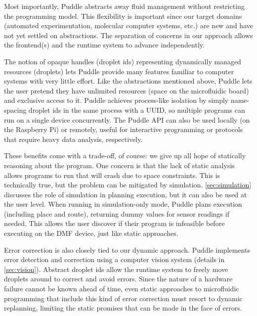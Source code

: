 \documentclass[sigconf, screen]{acmart}
\newcommand\karin[1]{\todo[color=green!80]{\sf #1}}
\newcommand\pavel[1]{\todo[color=blue!60]{\sf #1}}
\begin{document}
Most importantly, Puddle abstracts away fluid management without restricting the programming model.
This flexibility is important since our target domains (automated experimentation, molecular computer systems, etc.) are new and have not yet settled on abstractions.
The separation of concerns in our approach allows the frontend(s) and the runtime system to advance independently.

The notion of opaque handles (droplet ids) representing dynamically managed resources (droplets) lets Puddle provide many features familiar to computer systems with very little effort.
Like the abstractions mentioned above, Puddle lets the user pretend they have unlimited resources (space on the microfluidic board) and exclusive access to it.
Puddle achieves process-like isolation by simply name-spacing droplet ids in the same process with a UUID, so multiple programs can run on a single device concurrently.
The Puddle API can also be used locally (on the Raspberry Pi) or remotely, useful for interactive programming or protocols that require heavy data analysis, respectively.

\pavel{split here, move above to 3.2}

These benefits come with a trade-off, of course: we give up all hope of statically reasoning about the program.
One concern is that the lack of static analysis allows programs to run that will crash due to space constraints.
This is technically true, but the problem can be mitigated by simulation.
\autoref{sec:simulation} discusses the role of simulation in planning execution, but it can also be used at the user level.
When running in simulation-only mode, Puddle plans execution (including place and route), returning dummy values for sensor readings if needed.
This allows the user discover if their program is infeasible before executing on the DMF device, just like static approaches.

Error correction is also closely tied to our dynamic approach.
Puddle implements error detection and correction using a computer vision system (details in \autoref{sec:vision}).
Abstract droplet ids allow the runtime system to freely move droplets around to correct and avoid errors.
Since the nature of a hardware failure cannot be known ahead of time, even static approaches to microfluidic programming that include this kind of error correction must resort to dynamic replanning, limiting the static promises that can be made in the face of errors.
\end{document}
